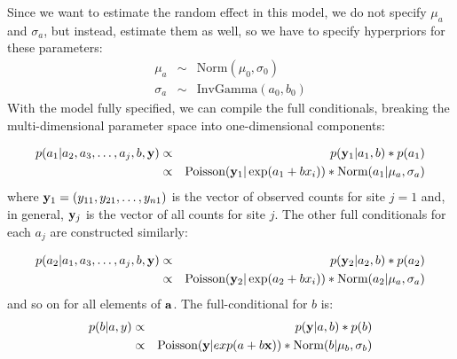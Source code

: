 Since we want to estimate the random effect in this model, we do not
specify $\mu_a$ and $\sigma_a$, but instead, estimate them as well, so we have
to specify hyperpriors for these parameters:
\begin{eqnarray*}
\mu_a  &\sim &  \mbox{Norm}(\mu_0, \sigma_0)  \\
\sigma_{a} & \sim & \mbox{InvGamma}(a_0, b_0)
\end{eqnarray*}
With the model fully specified, we can compile the full conditionals,
breaking the multi-dimensional parameter space into one-dimensional
components:

\begin{eqnarray*}
p(a_1|a_2,a_3,\ldots,a_j,b,{\bf y}) & \propto &   p({\bf y}_{1}|a_1,b) * p(a_1) \\
	 & \propto  &   \mbox{Poisson}({\bf y}_{1}| \exp(a_1 + bx_i)) * \mbox{Norm}(a_1|\mu_a, \sigma_a)
\end{eqnarray*}
where ${\bf y}_{1} = (y_{11},y_{21}, \ldots, y_{n1})$ is the vector of
observed counts for site $j=1$ and, in general, ${\bf y}_{j}$ is the
vector of all counts for site $j$. The other full conditionals for
each $a_{j}$ are constructed similarly:

\begin{eqnarray*}
p(a_2|a_1,a_3,\ldots,a_j,b,{\bf y}) & \propto&  p({\bf y}_{2}|a_2,b) * p(a_2) \\
	 & \propto  & \mbox{Poisson}({\bf y}_{2}| \exp(a_2 + bx_i)) * \mbox{Norm}(a_2|\mu_a, \sigma_a)
\end{eqnarray*}
and so on for all elements of ${\bf a}$. The full-conditional for $b$ is:
\begin{eqnarray*}
p(b|a,y) &\propto & p({\bf y}|a,b) * p(b) \\
	 &\propto& \mbox{Poisson}({\bf y}|exp(a + b{\bf x})) *\mbox{Norm}(b|\mu_b, \sigma_b)
\end{eqnarray*}

